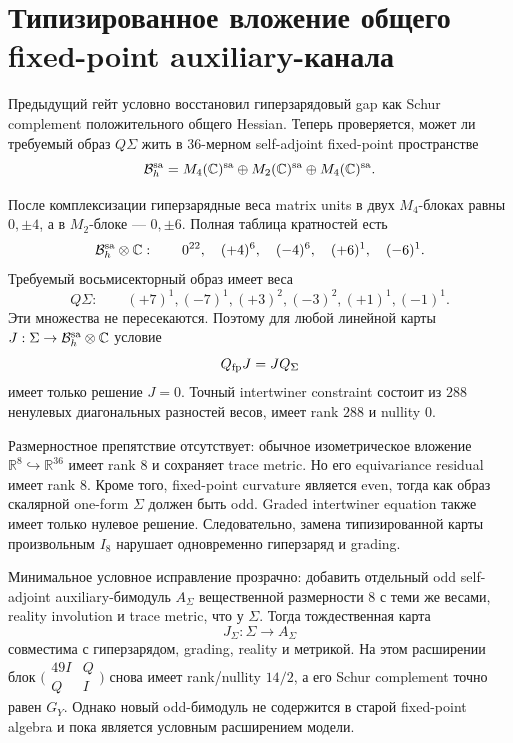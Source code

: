 \chapter{Типизированное вложение общего fixed-point auxiliary-канала}
\label{ch:v10-h15-r2-shared-fixed-point-auxiliary-embedding}

Предыдущий гейт условно восстановил гиперзарядовый gap как Schur complement
положительного общего Hessian. Теперь проверяется, может ли требуемый образ
$Q\Sigma$ жить в $36$-мерном self-adjoint fixed-point пространстве
\begin{equation}
 \mathcal B_h^{\rm sa}=M_4(\mathbb C)^{\rm sa}
 \oplus M_2(\mathbb C)^{\rm sa}\oplus M_4(\mathbb C)^{\rm sa}.
\end{equation}

После комплексизации гиперзарядные веса matrix units в двух $M_4$-блоках
равны $0,\pm4$, а в $M_2$-блоке --- $0,\pm6$. Полная таблица кратностей
есть
\begin{equation}
 \mathcal B_h^{\rm sa}\otimes\mathbb C:
 \qquad 0^{22},\quad(+4)^6,\quad(-4)^6,\quad(+6)^1,\quad(-6)^1.
\end{equation}
Требуемый восьмисекторный образ имеет веса
\begin{equation}
 Q\Sigma:\qquad(+7)^1,(-7)^1,(+3)^2,(-3)^2,(+1)^1,(-1)^1.
\end{equation}
Эти множества не пересекаются. Поэтому для любой линейной карты
$J:\Sigma\to\mathcal B_h^{\rm sa}\otimes\mathbb C$ условие
\begin{equation}
 Q_{\rm fp}J=JQ_\Sigma
\end{equation}
имеет только решение $J=0$. Точный intertwiner constraint состоит из $288$
ненулевых диагональных разностей весов, имеет rank $288$ и nullity $0$.

Размерностное препятствие отсутствует: обычное изометрическое вложение
$\mathbb R^8\hookrightarrow\mathbb R^{36}$ имеет rank $8$ и сохраняет
trace metric. Но его equivariance residual имеет rank $8$. Кроме того,
fixed-point curvature является even, тогда как образ скалярной one-form
$\Sigma$ должен быть odd. Graded intertwiner equation также имеет только
нулевое решение. Следовательно, замена типизированной карты произвольным
$I_8$ нарушает одновременно гиперзаряд и grading.

Минимальное условное исправление прозрачно: добавить отдельный odd
self-adjoint auxiliary-бимодуль $A_\Sigma$ вещественной размерности $8$ с
теми же весами, reality involution и trace metric, что у $\Sigma$. Тогда
тождественная карта
\begin{equation}
 J_\Sigma:\Sigma\longrightarrow A_\Sigma
\end{equation}
совместима с гиперзарядом, grading, reality и метрикой. На этом расширении
блок $\bigl(\begin{smallmatrix}49I&Q\\Q&I\end{smallmatrix}\bigr)$ снова
имеет rank/nullity $14/2$, а его Schur complement точно равен $G_Y$.
Однако новый odd-бимодуль не содержится в старой fixed-point algebra и
пока является условным расширением модели.

